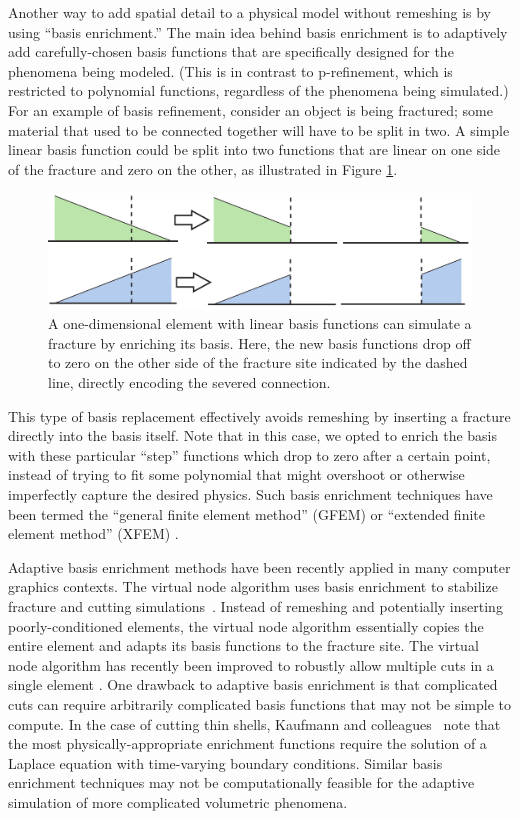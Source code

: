 Another way to add spatial detail to a physical model without remeshing is by using ``basis enrichment.'' The main idea behind basis enrichment is to adaptively add carefully-chosen basis functions that are specifically designed for the phenomena being modeled. (This is in contrast to p-refinement, which is restricted to polynomial functions, regardless of the phenomena being simulated.) For an example of basis refinement, consider an object is being fractured; some material that used to be connected together will have to be split in two. A simple linear basis function could be split into two functions that are linear on one side of the fracture and zero on the other, as illustrated in Figure \ref{fig:basisenrichment}. 
\begin{figure}[t]
	\centering
	\includegraphics[width=0.8\linewidth]{images/starAdaptivity-cgf2016/xfem.png}
	\caption[STAR adaptivity: XFEM illustration]{\label{fig:basisenrichment}
		A one-dimensional element with linear basis functions can simulate a fracture by enriching its basis. Here, the new basis functions drop off to zero on the other side of the fracture site indicated by the dashed line, directly encoding the severed connection.
	}
\end{figure}

This type of basis replacement effectively avoids remeshing by inserting a fracture directly into the basis itself. Note that in this case, we opted to enrich the basis with these particular ``step'' functions which drop to zero after a certain point, instead of trying to fit some polynomial that might overshoot or otherwise imperfectly capture the desired physics. Such basis enrichment techniques have been termed the ``general finite element method'' (GFEM) or ``extended finite element method'' (XFEM) \cite{belytschko2009review}.

Adaptive basis enrichment methods have been recently applied in many computer graphics contexts.
The virtual node algorithm uses basis enrichment to stabilize fracture and cutting simulations~\cite{Molino2004,hegemann2013level}. Instead of remeshing and potentially inserting poorly-conditioned elements, the virtual node algorithm essentially copies the entire element and adapts its basis functions to the fracture site. The virtual node algorithm  has recently been improved to robustly allow multiple cuts in a single element \cite{Sifakis2007:Cutting,Wang2014}. One drawback to adaptive basis enrichment is that complicated cuts can require arbitrarily complicated basis functions that may not be simple to compute. In the case of cutting thin shells, Kaufmann and colleagues~\cite{Kaufmann2009} note that the most physically-appropriate enrichment functions require the solution of a Laplace equation with time-varying boundary conditions. Similar basis enrichment techniques may not be computationally feasible for the adaptive simulation of more complicated volumetric phenomena.

